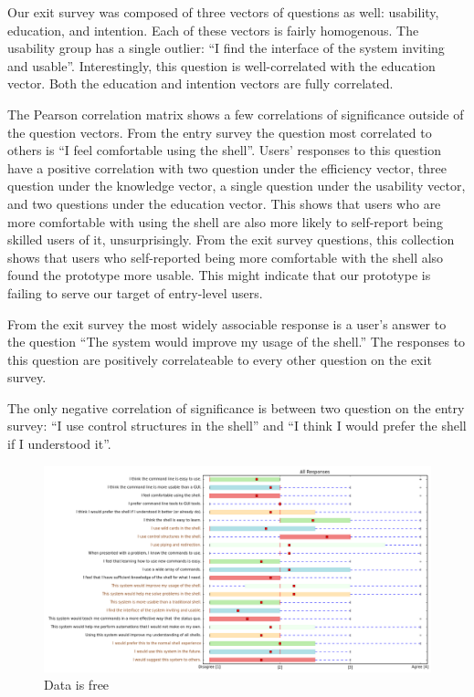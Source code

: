 Our exit survey was composed of three vectors of questions as well: usability,
education, and intention. Each of these vectors is fairly homogenous. The
usability group has a single outlier: ``I find the interface of the system
inviting and usable''. Interestingly, this question is well-correlated with the
education vector. Both the education and intention vectors are fully correlated.

The Pearson correlation matrix shows a few correlations of significance outside
of the question vectors.  From the entry survey the question most correlated to
others is ``I feel comfortable using the shell''. Users' responses to this question
have a positive correlation with two question under the efficiency vector, three
question under the knowledge vector, a single question under the usability
vector, and two questions under the education vector. This shows that users who
are more comfortable with using the shell are also more likely to self-report
being skilled users of it, unsurprisingly. From the exit survey questions, this
collection shows that users who self-reported being more comfortable with the
shell also found the prototype more usable. This might indicate that our
prototype is failing to serve our target of entry-level users.

From the exit survey the most widely associable response is a user's answer to
the question ``The system would improve my usage of the shell.'' The responses to
this question are positively correlateable to every other question on the exit
survey.

The only negative correlation of significance is between two question on the
entry survey: ``I use control structures in the shell'' and ``I think I would
prefer the shell if I understood it''.

\begin{figure}[H]
  \centering
  \includegraphics[width=\textwidth]{figures/stats/all.png}
  \caption{Data is free}
  \label{fig:alldata}
\end{figure}

